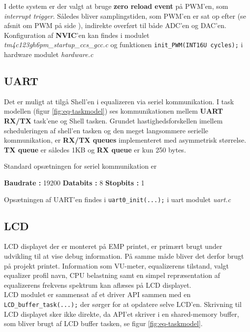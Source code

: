 I dette system er der valgt at bruge \textbf{zero reload event} på PWM'en, som \textit{interrupt trigger}.
Således bliver samplingstiden, som PWM'en er sat op efter (se afsnit om PWM på side \pageref{subsec:pwm}), indirekte overført til både ADC'en og DAC'en.\\ 

Konfiguration af \textbf{NVIC}'en kan findes i modulet \textit{tm4c123gh6pm\_startup\_ccs\_gcc.c} og funktionen \texttt{init\_PWM(INT16U cycles);} i hardware modulet \textit{hardware.c}

\subsection{UART}\label{subsec:uart}
Det er muligt at tilgå Shell'en i equalizeren via seriel kommunikation.
I task modellen (figur \ref{fig:eq-taskmodel}) ses kommunikationen mellem \textbf{UART RX/TX} task'ene og Shell tasken.
Grundet hastighedsforskellen imellem scheduleringen af shell'en tasken og den meget langsommere serielle kommunikation, er \textbf{RX/TX queues} implementeret med asymmetrisk størrelse. 	
\textbf{TX queue} er således 1KB og \textbf{RX queue} er kun  250 bytes.

Standard opsætningen for seriel kommunikation er
\begin{center}
	\textbf{Baudrate : }19200  \quad \textbf{Databits : } 8 \quad \textbf{Stopbits : }1
\end{center}

Opsætningen af UART'en findes i \texttt{uart0\_init(...);} i uart modulet \textit{uart.c}

\subsection{LCD}
LCD displayet der er monteret på EMP printet, er primært brugt under udvikling til at vise debug information. På samme måde bliver det derfor  brugt på projekt printet.
Information som VU-meter, equalizerens tilstand, valgt equalizer profil navn, CPU belastning samt en simpel repræsentation af equalizerens frekvens spektrum kan aflæses på LCD displayet.\\

LCD modulet er sammensat af et driver API sammen med en \texttt{LCD\_buffer\_task(...);} der sørger for at opdatere selve LCD'en.
Skrivning til LCD displayet sker ikke direkte, da API'et skriver i en shared-memory buffer, som bliver brugt af LCD buffer tasken, se figur \ref{fig:eq-taskmodel}.\\
 
